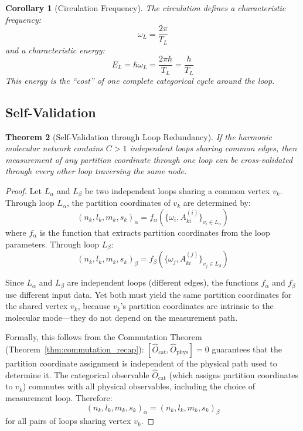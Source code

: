 \documentclass[11pt,twocolumn,a4paper]{article}
\newtheorem{theorem}{Theorem}[section]
\newtheorem{corollary}[theorem]{Corollary}
\theoremstyle{definition}
\theoremstyle{remark}
\newcommand{\Aki}{A_{ki}}
\begin{document}
\begin{corollary}[Circulation Frequency]
\label{cor:circulation_frequency}
The circulation defines a characteristic frequency:
\begin{equation}
\omega_L = \frac{2\pi}{T_L}
\end{equation}
and a characteristic energy:
\begin{equation}
E_L = \hbar\omega_L = \frac{2\pi\hbar}{T_L} = \frac{h}{T_L}
\end{equation}
This energy is the ``cost'' of one complete categorical cycle around the loop.
\end{corollary}

\subsection{Self-Validation}

\begin{theorem}[Self-Validation through Loop Redundancy]
\label{thm:self_validation}
If the harmonic molecular network contains $C > 1$ independent loops sharing common edges, then measurement of any partition coordinate through one loop can be cross-validated through every other loop traversing the same node.
\end{theorem}

\begin{proof}
Let $L_\alpha$ and $L_\beta$ be two independent loops sharing a common vertex $v_k$. Through loop $L_\alpha$, the partition coordinates of $v_k$ are determined by:
\begin{equation}
(n_k, l_k, m_k, s_k)_\alpha = f_\alpha(\{\omega_i, \Aki^{(i)}\}_{v_i \in L_\alpha})
\end{equation}
where $f_\alpha$ is the function that extracts partition coordinates from the loop parameters. Through loop $L_\beta$:
\begin{equation}
(n_k, l_k, m_k, s_k)_\beta = f_\beta(\{\omega_j, \Aki^{(j)}\}_{v_j \in L_\beta})
\end{equation}

Since $L_\alpha$ and $L_\beta$ are independent loops (different edges), the functions $f_\alpha$ and $f_\beta$ use different input data. Yet both must yield the same partition coordinates for the shared vertex $v_k$, because $v_k$'s partition coordinates are intrinsic to the molecular mode---they do not depend on the measurement path.

Formally, this follows from the Commutation Theorem (Theorem~\ref{thm:commutation_recap}): $[\hat{O}_{\mathrm{cat}}, \hat{O}_{\mathrm{phys}}] = 0$ guarantees that the partition coordinate assignment is independent of the physical path used to determine it. The categorical observable $\hat{O}_{\mathrm{cat}}$ (which assigns partition coordinates to $v_k$) commutes with all physical observables, including the choice of measurement loop. Therefore:
\begin{equation}
(n_k, l_k, m_k, s_k)_\alpha = (n_k, l_k, m_k, s_k)_\beta
\end{equation}
for all pairs of loops sharing vertex $v_k$.
\end{proof}
\end{document}
